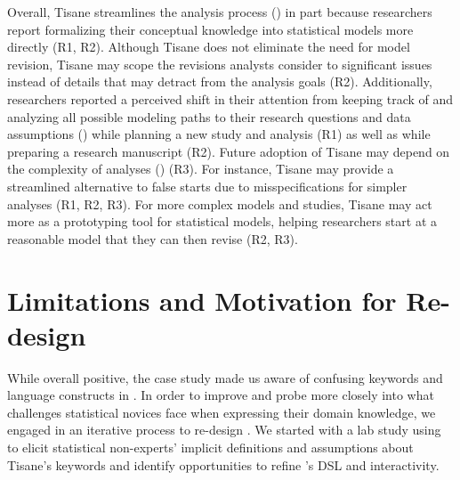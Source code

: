 Overall, Tisane streamlines the analysis process (\rqWorkflow) in part because
researchers report formalizing their conceptual knowledge into statistical
models more directly (R1, R2). Although Tisane does not eliminate the need for
model revision, Tisane may scope the revisions analysts consider to significant
issues instead of details that may detract from the analysis goals (R2).
Additionally, researchers reported a perceived shift in their attention from
keeping track of and analyzing all possible modeling paths to their research
questions and data assumptions (\rqCognitive) while planning a new study and
analysis (R1) as well as while preparing a research manuscript (R2). Future adoption of
Tisane may depend on the complexity of analyses (\rqFuture) (R3). For instance, Tisane may provide a
streamlined alternative to false starts due to misspecifications for simpler
analyses (R1, R2, R3). For more complex models and studies, Tisane may act more as a
prototyping tool for statistical models, helping researchers start at a
reasonable model that they can then revise (R2, R3).

\section{Limitations and Motivation for Re-design}
While overall positive, the case study made us aware of confusing keywords and
language constructs in \tisane. In order to improve \tisane and probe more
closely into what challenges statistical novices face when expressing their
domain knowledge, we engaged in an iterative process to re-design \tisane. We
started with a lab study using \tisane~\cite{jun2022tisane} to elicit
statistical non-experts' implicit definitions and assumptions about Tisane's
keywords and identify opportunities to refine \tisane's DSL and interactivity.


